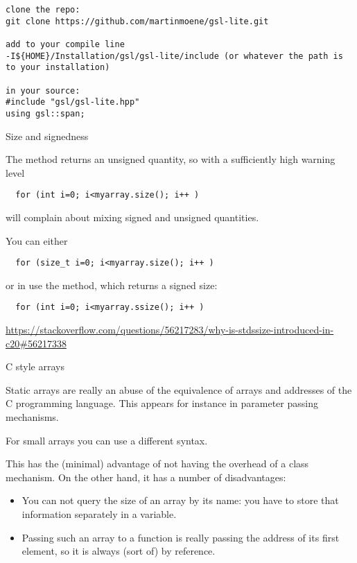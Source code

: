 \begin{verbatim}
clone the repo: 
git clone https://github.com/martinmoene/gsl-lite.git

add to your compile line 
-I${HOME}/Installation/gsl/gsl-lite/include (or whatever the path is to your installation)

in your source:
#include "gsl/gsl-lite.hpp"
using gsl::span;
\end{verbatim}

 {Size and signedness}

The  method returns an unsigned quantity,
so with a sufficiently high warning level
\begin{lstlisting}
  for (int i=0; i<myarray.size(); i++ )
\end{lstlisting}
will complain about mixing signed and unsigned quantities.

You can either
\begin{lstlisting}
  for (size_t i=0; i<myarray.size(); i++ )
\end{lstlisting}
or in  use the  method,
which returns a signed size:
\begin{lstlisting}
  for (int i=0; i<myarray.ssize(); i++ )
\end{lstlisting}

\url{https://stackoverflow.com/questions/56217283/why-is-stdssize-introduced-in-c20#56217338}

 {C style arrays}
\label{sec:staticarray}

Static arrays are really an abuse of the equivalence of arrays and
addresses of the C programming language. This appears for instance in
parameter passing mechanisms.

For small arrays you can use a different syntax. 


This has the
(minimal) advantage of not having the overhead of a class
mechanism. On the other hand, it has a number of disadvantages:
\begin{itemize}
\item You can not query the size of an array by its name: you have to
  store that information separately in a variable.
\item Passing such an array to a function is really passing the
  address of its first element, so it is always (sort of) by
  reference.
\end{itemize}

